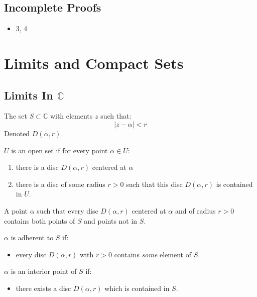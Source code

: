 \subsection{Incomplete Proofs}
\begin{itemize}
	\item 3, 4
\end{itemize}


\section{Limits and Compact Sets}

\subsection{Limits In $\mathbb{C}$}

\begin{defn}
	The set $S \subset \mathbb{C}$ with elements $z$ such that:
	\[ |z - \alpha | < r \]
	Denoted $D(\alpha, r).$
\end{defn}

\begin{defn}
	$U$ is an open set if for every point $\alpha \in U$:
	\begin{enumerate}
		\item there is a disc $D(\alpha,r)$ centered at $\alpha$
		\item there is a disc of some radius $r > 0$ such that this disc $D(\alpha, r)$ is contained in $U.$
	\end{enumerate}
\end{defn}

\begin{defn}
	A point $\alpha$ such that every disc $D(\alpha, r)$ centered at $\alpha$ and of 
	radius $r > 0$ contains both points of $S$ and points not in $S.$
\end{defn}

\begin{defn}
	$\alpha$ is adherent to $S$ if: 
	\begin{itemize}
		\item every disc $D(\alpha, r)$ with $r > 0$ contains \textit{some} element of $S.$
	\end{itemize}
\end{defn}

\begin{defn}
	$\alpha$ is an interior point of $S$ if:
	\begin{itemize}
		\item there exists a disc $D(\alpha, r)$ which is contained in $S.$
	\end{itemize}
\end{defn}


